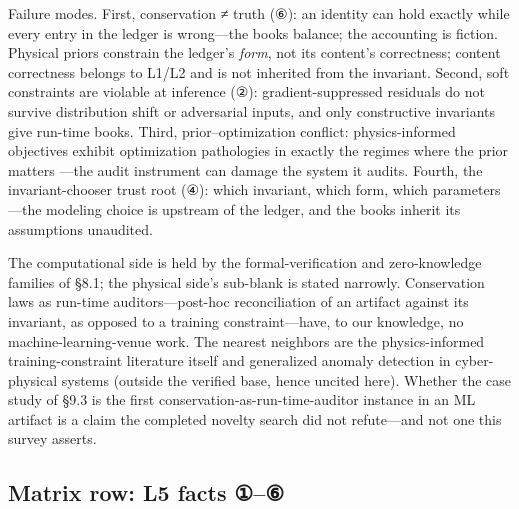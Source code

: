 \documentclass[11pt,a4paper]{article}
\begin{document}
Failure modes. First, conservation ≠ truth (⑥): an identity can hold exactly while every entry in the ledger is wrong—the books balance; the accounting is fiction. Physical priors constrain the ledger's \textit{form}, not its content's correctness; content correctness belongs to L1/L2 and is not inherited from the invariant. Second, soft constraints are violable at inference (②): gradient-suppressed residuals do not survive distribution shift or adversarial inputs, and only constructive invariants give run-time books. Third, prior–optimization conflict: physics-informed objectives exhibit optimization pathologies in exactly the regimes where the prior matters \cite{key13}—the audit instrument can damage the system it audits. Fourth, the invariant-chooser trust root (④): which invariant, which form, which parameters—the modeling choice is upstream of the ledger, and the books inherit its assumptions unaudited.

The computational side is held by the formal-verification and zero-knowledge families of §8.1; the physical side's sub-blank is stated narrowly. Conservation laws as run-time auditors—post-hoc reconciliation of an artifact against its invariant, as opposed to a training constraint—have, to our knowledge, no machine-learning-venue work. The nearest neighbors are the physics-informed training-constraint literature itself \cite{key12,key13} and generalized anomaly detection in cyber-physical systems (outside the verified base, hence uncited here). Whether the case study of §9.3 is the first conservation-as-run-time-auditor instance in an ML artifact is a claim the completed novelty search did not refute—and not one this survey asserts.

\subsection{Matrix row: L5 facts ①–⑥}
\end{document}
